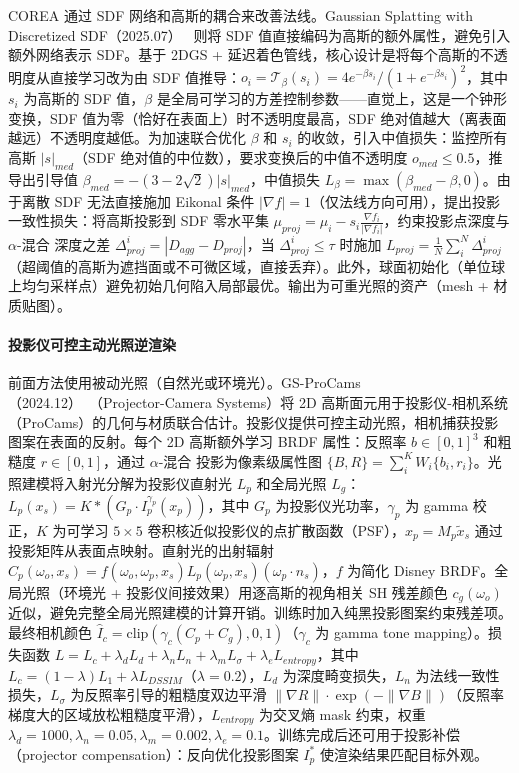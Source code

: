 COREA 通过 SDF 网络和高斯的耦合来改善法线。Gaussian Splatting with Discretized SDF（2025.07）~\cite{2507_15629} 则将 SDF 值直接编码为高斯的额外属性，避免引入额外网络表示 SDF。基于 2DGS + 延迟着色管线，核心设计是将每个高斯的不透明度从直接学习改为由 SDF 值推导：$o_i = \mathcal{T}_\beta(s_i) = 4e^{-\beta s_i}/(1+e^{-\beta s_i})^2$，其中 $s_i$ 为高斯的 SDF 值，$\beta$ 是全局可学习的方差控制参数——直觉上，这是一个钟形变换，SDF 值为零（恰好在表面上）时不透明度最高，SDF 绝对值越大（离表面越远）不透明度越低。为加速联合优化 $\beta$ 和 $s_i$ 的收敛，引入中值损失：监控所有高斯 $|s|_{med}$（SDF 绝对值的中位数），要求变换后的中值不透明度 $o_{med} \leq 0.5$，推导出引导值 $\beta_{med} = -(3-2\sqrt{2})|s|_{med}$，中值损失 $L_\beta = \max(\beta_{med} - \beta, 0)$。由于离散 SDF 无法直接施加 Eikonal 条件 $|\nabla f|=1$（仅法线方向可用），提出投影一致性损失：将高斯投影到 SDF 零水平集 $\mu_{proj} = \mu_i - s_i \frac{\nabla f_i}{|\nabla f_i|}$，约束投影点深度与 $\alpha$-混合 深度之差 $\Delta_{proj}^i = |D_{agg} - D_{proj}|$，当 $\Delta_{proj}^i \leq \tau$ 时施加 $L_{proj} = \frac{1}{N}\sum_{i}^{N}\Delta_{proj}^i$（超阈值的高斯为遮挡面或不可微区域，直接丢弃）。此外，球面初始化（单位球上均匀采样点）避免初始几何陷入局部最优。输出为可重光照的资产（mesh + 材质贴图）。

\paragraph{投影仪可控主动光照逆渲染}

前面方法使用被动光照（自然光或环境光）。GS-ProCams（2024.12）~\cite{2412_11762}（Projector-Camera Systems）将 2D 高斯面元用于投影仪-相机系统（ProCams）的几何与材质联合估计。投影仪提供可控主动光照，相机捕获投影图案在表面的反射。每个 2D 高斯额外学习 BRDF 属性：反照率 $b \in [0,1]^3$ 和粗糙度 $r \in [0,1]$，通过 $\alpha$-混合 投影为像素级属性图 $\{B, R\} = \sum_{i}^{K} W_i \{b_i, r_i\}$。光照建模将入射光分解为投影仪直射光 $L_p$ 和全局光照 $L_g$：$L_p(x_s) = K * (G_p \cdot I_p^{\gamma_p}(x_p))$，其中 $G_p$ 为投影仪光功率，$\gamma_p$ 为 gamma 校正，$K$ 为可学习 $5\times5$ 卷积核近似投影仪的点扩散函数（PSF），$x_p = M_p \tilde{x}_s$ 通过投影矩阵从表面点映射。直射光的出射辐射 $C_p(\omega_o, x_s) = f(\omega_o, \omega_p, x_s) L_p(\omega_p, x_s)(\omega_p \cdot n_s)$，$f$ 为简化 Disney BRDF。全局光照（环境光 + 投影仪间接效果）用逐高斯的视角相关 SH 残差颜色 $c_g(\omega_o)$ 近似，避免完整全局光照建模的计算开销。训练时加入纯黑投影图案约束残差项。最终相机颜色 $\hat{I}_c = \text{clip}(\gamma_c(C_p + C_g), 0, 1)$（$\gamma_c$ 为 gamma tone mapping）。损失函数 $L = L_c + \lambda_d L_d + \lambda_n L_n + \lambda_m L_\sigma + \lambda_e L_{entropy}$，其中 $L_c = (1-\lambda)L_1 + \lambda L_{DSSIM}$（$\lambda=0.2$），$L_d$ 为深度畸变损失，$L_n$ 为法线一致性损失，$L_\sigma$ 为反照率引导的粗糙度双边平滑 $\|\nabla R\| \cdot \exp(-\|\nabla B\|)$（反照率梯度大的区域放松粗糙度平滑），$L_{entropy}$ 为交叉熵 mask 约束，权重 $\lambda_d=1000, \lambda_n=0.05, \lambda_m=0.002, \lambda_e=0.1$。训练完成后还可用于投影补偿（projector compensation）：反向优化投影图案 $I_p^*$ 使渲染结果匹配目标外观。

